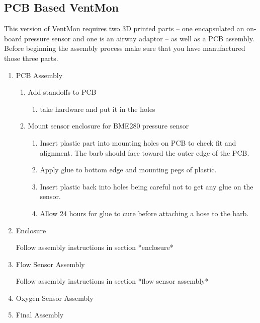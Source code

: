 \documentclass[11pt, letterpaper]{article}
\begin{document}
\subsection{PCB Based VentMon}

This version of VentMon requires two 3D printed parts  -- one encapsulated an on-board pressure sensor and one is an airway adaptor -- as well as a PCB assembly. Before beginning the assembly process make sure that you have manufactured those three parts.

\begin{enumerate}
\item
PCB Assembly

\begin{enumerate}[label=1.\arabic*]
\item Add standoffs to PCB
\begin{enumerate}[label=1.1.\arabic*]
\item take hardware and put it in the holes
\end{enumerate}

\item Mount sensor enclosure for BME280 pressure sensor
\begin{enumerate}[label=1.2.\arabic*]
\item Insert plastic part into mounting holes on PCB to check fit and alignment. The barb should face toward the outer edge of the PCB.
\item Apply glue to bottom edge and mounting pegs of plastic.
\item Insert plastic back into holes being careful not to get any glue on the sensor.
\item Allow 24 hours for glue to cure before attaching a hose to the barb.
\end{enumerate}


\end{enumerate}



\item
Enclosure

Follow assembly instructions in section *enclosure*


\item
Flow Sensor Assembly

Follow assembly instructions in section *flow sensor assembly*

\item
Oxygen Sensor Assembly



\item
Final Assembly

\end{enumerate}
\end{document}
